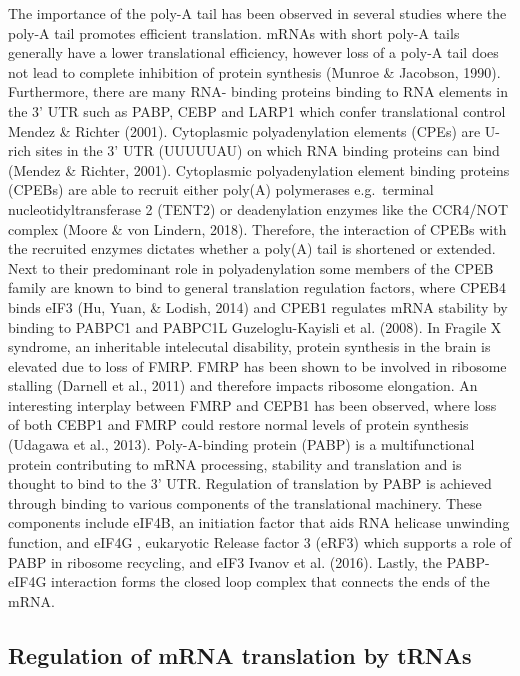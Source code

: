 \documentclass[
  12pt,
  openany]{book}
\begin{document}
The importance of the poly-A tail has been observed in several studies where the poly-A tail promotes efficient translation. mRNAs with short poly-A tails generally have a lower translational efficiency, however loss of a poly-A tail does not lead to complete inhibition of protein synthesis (Munroe \& Jacobson, 1990). Furthermore, there are many RNA- binding proteins binding to RNA elements in the 3' UTR such as PABP, CEBP and LARP1 which confer translational control Mendez \& Richter (2001). Cytoplasmic polyadenylation elements (CPEs) are U-rich sites in the 3' UTR (UUUUUAU) on which RNA binding proteins can bind (Mendez \& Richter, 2001). Cytoplasmic polyadenylation element binding proteins (CPEBs) are able to recruit either poly(A) polymerases e.g.~terminal nucleotidyltransferase 2 (TENT2) or deadenylation enzymes like the CCR4/NOT complex (Moore \& von Lindern, 2018). Therefore, the interaction of CPEBs with the recruited enzymes dictates whether a poly(A) tail is shortened or extended. Next to their predominant role in polyadenylation some members of the CPEB family are known to bind to general translation regulation factors, where CPEB4 binds eIF3 (Hu, Yuan, \& Lodish, 2014) and CPEB1 regulates mRNA stability by binding to PABPC1 and PABPC1L Guzeloglu-Kayisli et al. (2008). In Fragile X syndrome, an inheritable intelecutal disability, protein synthesis in the brain is elevated due to loss of FMRP. FMRP has been shown to be involved in ribosome stalling (Darnell et al., 2011) and therefore impacts ribosome elongation. An interesting interplay between FMRP and CEPB1 has been observed, where loss of both CEBP1 and FMRP could restore normal levels of protein synthesis (Udagawa et al., 2013). Poly-A-binding protein (PABP) is a multifunctional protein contributing to mRNA processing, stability and translation and is thought to bind to the 3' UTR. Regulation of translation by PABP is achieved through binding to various components of the translational machinery. These components include eIF4B, an initiation factor that aids RNA helicase unwinding function, and eIF4G , eukaryotic Release factor 3 (eRF3) which supports a role of PABP in ribosome recycling, and eIF3 Ivanov et al. (2016). Lastly, the PABP-eIF4G interaction forms the closed loop complex that connects the ends of the mRNA.

\subsection{Regulation of mRNA translation by tRNAs}
\end{document}
